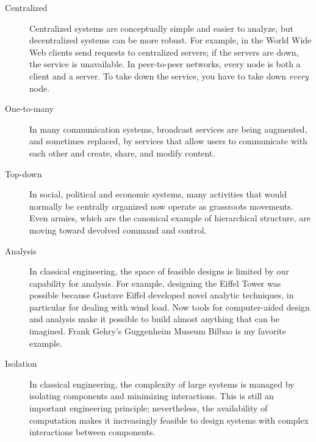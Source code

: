 \documentclass[12pt]{book}
\theoremstyle{exercise}
\newcommand{\myrightarrow}{\ensuremath \rightarrow}
\begin{document}
\begin{description}

\item[Centralized \myrightarrow~decentralized] Centralized systems are
  conceptually simple and easier to analyze, but decentralized systems
  can be more robust.  For example, in the World Wide Web clients send
  requests to centralized servers; if the servers are down, the
  service is unavailable.  In peer-to-peer networks, every node is
  both a client and a server.  To take down the service, you have to
  take down {\em every} node.


\item[One-to-many \myrightarrow~many-to-many] In many communication
  systems, broadcast services are being augmented, and sometimes
  replaced, by services that allow users to communicate with each
  other and create, share, and modify content.


\item[Top-down \myrightarrow~bottom-up] In social, political and
  economic systems, many activities that would normally be centrally
  organized now operate as grassroots movements.  Even armies, which
  are the canonical example of hierarchical structure, are moving
  toward devolved command and control.


\item[Analysis \myrightarrow~computation] In classical engineering,
  the space of feasible designs is limited by our capability for
  analysis.  For example, designing the Eiffel Tower was possible
  because Gustave Eiffel developed novel analytic techniques, in
  particular for dealing with wind load.  Now tools for computer-aided
  design and analysis make it possible to build almost anything that
  can be imagined.  Frank Gehry's Guggenheim Museum Bilbao is my
  favorite example.


\item[Isolation \myrightarrow~interaction] In classical engineering,
  the complexity of large systems is managed by isolating components
  and minimizing interactions.  This is still an important engineering
  principle; nevertheless, the availability of computation makes
  it increasingly feasible to design systems with complex interactions
  between components.


\end{description}
\end{document}
